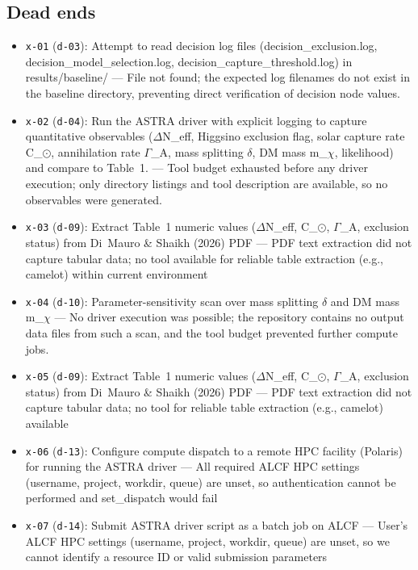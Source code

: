 \documentclass[11pt,a4paper]{article}
\begin{document}
\subsection{Dead ends}
\begin{itemize}
  \item \texttt{x-01} (\texttt{d-03}): Attempt to read decision log files (decision\_exclusion.log, decision\_model\_selection.log, decision\_capture\_threshold.log) in results/baseline/ --- File not found; the expected log filenames do not exist in the baseline directory, preventing direct verification of decision node values.
  \item \texttt{x-02} (\texttt{d-04}): Run the ASTRA driver with explicit logging to capture quantitative observables ($\Delta$N\_eff, Higgsino exclusion flag, solar capture rate C\_$\odot$, annihilation rate $\Gamma$\_A, mass splitting $\delta$, DM mass m\_$\chi$, likelihood) and compare to Table~1. --- Tool budget exhausted before any driver execution; only directory listings and tool description are available, so no observables were generated.
  \item \texttt{x-03} (\texttt{d-09}): Extract Table~1 numeric values ($\Delta$N\_eff, C\_$\odot$, $\Gamma$\_A, exclusion status) from Di~Mauro \& Shaikh (2026) PDF --- PDF text extraction did not capture tabular data; no tool available for reliable table extraction (e.g., camelot) within current environment
  \item \texttt{x-04} (\texttt{d-10}): Parameter-sensitivity scan over mass splitting $\delta$ and DM mass m\_$\chi$ --- No driver execution was possible; the repository contains no output data files from such a scan, and the tool budget prevented further compute jobs.
  \item \texttt{x-05} (\texttt{d-09}): Extract Table~1 numeric values ($\Delta$N\_eff, C\_$\odot$, $\Gamma$\_A, exclusion status) from Di~Mauro \& Shaikh (2026) PDF --- PDF text extraction did not capture tabular data; no tool for reliable table extraction (e.g., camelot) available
  \item \texttt{x-06} (\texttt{d-13}): Configure compute dispatch to a remote HPC facility (Polaris) for running the ASTRA driver --- All required ALCF HPC settings (username, project, workdir, queue) are unset, so authentication cannot be performed and set\_dispatch would fail
  \item \texttt{x-07} (\texttt{d-14}): Submit ASTRA driver script as a batch job on ALCF --- User's ALCF HPC settings (username, project, workdir, queue) are unset, so we cannot identify a resource ID or valid submission parameters
\end{itemize}
\end{document}
